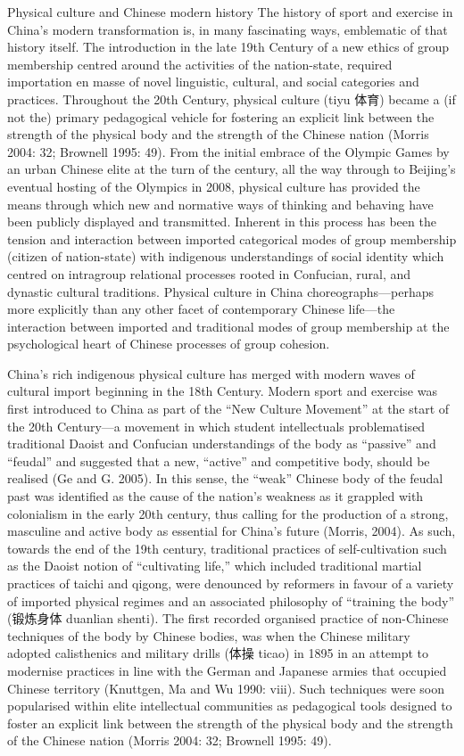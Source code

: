 \documentclass[12pt]{report}
\begin{document}
Physical culture and Chinese modern history
The history of sport and exercise in China's modern transformation is, in many fascinating ways, emblematic of that history itself.  The introduction in the late 19th Century of a new ethics of group membership centred around the activities of the nation-state, required importation en masse of novel linguistic, cultural, and social categories and practices.  Throughout the 20th Century, physical culture (tiyu 体育) became a (if not the) primary pedagogical vehicle for fostering an explicit link between the strength of the physical body and the strength of the Chinese nation (Morris 2004: 32; Brownell 1995: 49).  From the initial embrace of the Olympic Games by an urban Chinese elite at the turn of the century, all the way through to Beijing’s eventual hosting of the Olympics in 2008, physical culture has provided the means through which new and normative ways of thinking and behaving have been publicly displayed and transmitted.  Inherent in this process has been the tension and interaction between imported categorical modes of group membership (citizen of nation-state) with indigenous understandings of social identity which centred on intragroup relational processes rooted in Confucian, rural, and dynastic cultural traditions.  Physical culture in China choreographs—perhaps more explicitly than any other facet of contemporary Chinese life—the interaction between imported and traditional modes of group membership at the psychological heart of Chinese processes of group cohesion.

China’s rich indigenous physical culture has merged with modern waves of cultural import beginning in the 18th Century. Modern sport and exercise was first introduced to China as part of the “New Culture Movement” at the start of the 20th Century—a movement in which student intellectuals problematised traditional Daoist and Confucian understandings of the body as “passive” and “feudal” and suggested that a new, “active” and competitive body, should be realised (Ge and G. 2005).  In this sense, the “weak” Chinese body of the feudal past was identified as the cause of the nation’s weakness as it grappled with colonialism in the early 20th century, thus calling for the production of a strong, masculine and active body as essential for China’s future (Morris, 2004).  As such, towards the end of the 19th century, traditional practices of self-cultivation such as the Daoist notion of “cultivating life,” which included traditional martial practices of taichi and qigong, were denounced by reformers in favour of a variety of imported physical regimes and an associated philosophy of “training the body” (锻炼身体 duanlian shenti).  The first recorded organised practice of non-Chinese techniques of the body by Chinese bodies, was when the Chinese military adopted calisthenics and military drills (体操 ticao) in 1895 in an attempt to modernise practices in line with the German and Japanese armies that occupied Chinese territory (Knuttgen, Ma and Wu 1990: viii).  Such techniques were soon popularised within elite intellectual communities as pedagogical tools designed to foster an explicit link between the strength of the physical body and the strength of the Chinese nation (Morris 2004: 32; Brownell 1995: 49).
\end{document}
